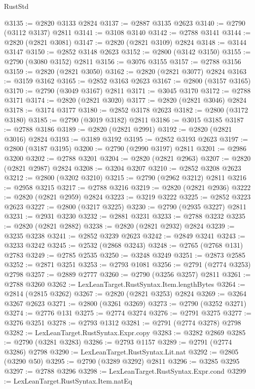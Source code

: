 \begin{lexlean}{RustStd}
\begin{coremodule}
@3135 := @2820 @3133 @2824
@3137 := @2887 @3135 @2623
@3140 := @2790 (@3112 @3137) @2811
@3141 := @3108 @3140
@3142 := @2788 @3141
@3144 := @2820 (@2821 @3081)
@3147 := @2820 (@2821 @3109) @2824
@3148 := @3144 @3147
@3150 := @2852 @3148 @2623
@3152 := @2800 (@3142 @3150)
@3155 := @2790 (@3080 @3152) @2811
@3156 := @3076 @3155
@3157 := @2788 @3156
@3159 := @2820 (@2821 @3050)
@3162 := @2820 (@2821 @3077) @2824
@3163 := @3159 @3162
@3165 := @2852 @3163 @2623
@3167 := @2800 (@3157 @3165)
@3170 := @2790 (@3049 @3167) @2811
@3171 := @3045 @3170
@3172 := @2788 @3171
@3174 := @2820 (@2821 @3020)
@3177 := @2820 (@2821 @3046) @2824
@3178 := @3174 @3177
@3180 := @2852 @3178 @2623
@3182 := @2800 (@3172 @3180)
@3185 := @2790 (@3019 @3182) @2811
@3186 := @3015 @3185
@3187 := @2788 @3186
@3189 := @2820 (@2821 @2991)
@3192 := @2820 (@2821 @3016) @2824
@3193 := @3189 @3192
@3195 := @2852 @3193 @2623
@3197 := @2800 (@3187 @3195)
@3200 := @2790 (@2990 @3197) @2811
@3201 := @2986 @3200
@3202 := @2788 @3201
@3204 := @2820 (@2821 @2963)
@3207 := @2820 (@2821 @2987) @2824
@3208 := @3204 @3207
@3210 := @2852 @3208 @2623
@3212 := @2800 (@3202 @3210)
@3215 := @2790 (@2962 @3212) @2811
@3216 := @2958 @3215
@3217 := @2788 @3216
@3219 := @2820 (@2821 @2936)
@3222 := @2820 (@2821 @2959) @2824
@3223 := @3219 @3222
@3225 := @2852 @3223 @2623
@3227 := @2800 (@3217 @3225)
@3230 := @2790 (@2935 @3227) @2811
@3231 := @2931 @3230
@3232 := @2881 @3231
@3233 := @2788 @3232
@3235 := @2820 (@2821 @2882)
@3238 := @2820 (@2821 @2932) @2824
@3239 := @3235 @3238
@3241 := @2852 @3239 @2623
@3242 := @2849 @3241
@3243 := @3233 @3242
@3245 := @2532 (@2868 @3243)
@3248 := @2765 (@2768 @131) @2783
@3249 := @2785 @2535
@3250 := @3248 @3249
@3251 := @2873 @2585
@3252 := @2871 @3251
@3253 := @2793 @1081
@3256 := @2791 (@2774 @3253) @2798
@3257 := @2889 @2777
@3260 := @2790 (@3256 @3257) @2811
@3261 := @2788 @3260
@3262 := LexLeanTarget.RustSyntax.Item.lengthBytes
@3264 := @2814 (@2815 @3262)
@3267 := @2820 (@2821 @3253) @2824
@3269 := @3264 @3267 @2623
@3271 := @2800 (@3261 @3269)
@3273 := @2790 (@3252 @3271)
@3274 := @2776 @131
@3275 := @2774 @3274
@3276 := @2791 @3275
@3277 := @3276 @3251
@3278 := @2793 @1312
@3281 := @2791 (@2774 @3278) @2798
@3282 := LexLeanTarget.RustSyntax.Expr.copy
@3283 := @3282 @2869
@3285 := @2790 (@3281 @3283)
@3286 := @2793 @1157
@3289 := @2791 (@2774 @3286) @2798
@3290 := LexLeanTarget.RustSyntax.Lit.nat
@3292 := @2805 (@3290 @50)
@3295 := @2790 (@3289 @3292) @2811
@3296 := @3285 @3295
@3297 := @2788 @3296
@3298 := LexLeanTarget.RustSyntax.Expr.cond
@3299 := LexLeanTarget.RustSyntax.Item.natEq

\end{coremodule}
\end{lexlean}
